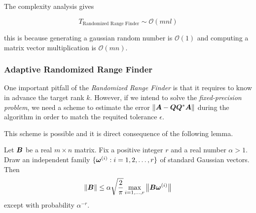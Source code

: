 \begin{figure}[ht]
\begin{center}
\end{center}
\end{figure}

The complexity analysis gives

\begin{equation}\label{eq:analysis-rand-finder}
T_{\text{Randomized Range Finder}}\sim \mathcal{O}(mnl)
\end{equation}

this is because generating a gaussian random number is $\mathcal{O}(1)$
and computing a matrix vector multiplication is $\mathcal{O}(mn)$.


\subsubsection{Adaptive Randomized Range Finder}

One important pitfall of the \textit{Randomized Range Finder} is that it
requires to know in advance the target rank $k$. However, if we intend
to solve the \textit{fixed-precision problem}, we need a scheme to estimate
the error $\|\bm{A}-\bm{Q}\bm{Q}^*\bm{A}\|$ during the algorithm
in order to match the requited tolerance $\epsilon$.

This scheme is possible and it is direct consequence of the following lemma.
\begin{lemma}
\label{thm:aposteriori}
Let $\bm{B}$ be a real $m\times n$ matrix.
Fix a positive integer $r$ and a real number $\alpha > 1$.
Draw an independent family $\{ \bm{\omega}^{(i)} : i = 1, 2, \dots, r \}$
of standard Gaussian vectors.  Then
\begin{equation*}
\left\Vert {\bm{B}} \right\Vert
    \leq \alpha \sqrt{\frac{2}{\pi}} \max_{i = 1, \dots, r}
    {\bigl\Vert {\bm{B}\bm{\omega}^{(i)} } \bigr\Vert}_{}
\end{equation*}
except with probability $\alpha^{-r}$.
\end{lemma}

